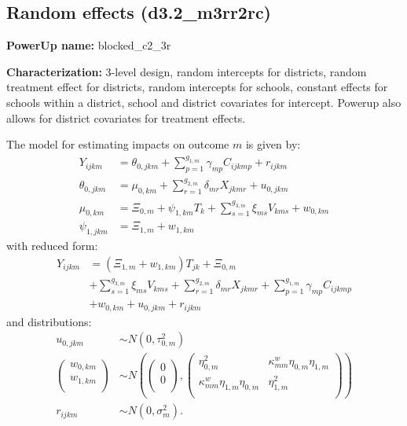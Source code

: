 \documentclass[12pt]{article}
\begin{document}
\newpage
\subsection{Random effects (d3.2\_m3rr2rc)}

\textbf{PowerUp name:} blocked\_c2\_3r

\textbf{Characterization:} 3-level design, random intercepts for districts, random treatment effect for districts, random intercepts for schools, constant effects for schools within a district, school and district covariates for intercept. Powerup also allows for district covariates for treatment effects.

The model for estimating impacts on outcome $m$ is given by:
\begin{align}
Y_{ijkm} &=  \theta_{0,jkm} + \sum_{p=1}^{g_{1,m}} \gamma_{mp} C_{ijkmp} + r_{ijkm}\\
\nonumber \theta_{0,jkm} &= \mu_{0,km} + \sum_{r=1}^{g_{2,m}} \delta_{mr} X_{jkmr} + u_{0,jkm}\\
\nonumber \mu_{0,km}  &= \Xi_{0,m} + \psi_{1,km} T_{k} + \sum_{s=1}^{g_{3,m}} \xi_{ms} V_{kms} + w_{0,km} \\
\nonumber \psi_{1,jkm} &= \Xi_{1,m} + w_{1,km}
\end{align}
with reduced form:
\begin{align}
Y_{ijkm} &= \left(\Xi_{1,m} + w_{1,km}\right) T_{jk} + \Xi_{0,m}\\
\nonumber & + \sum_{s=1}^{g_{3,m}} \xi_{ms} V_{kms} + \sum_{r=1}^{g_{2,m}} \delta_{mr} X_{jkmr} + \sum_{p=1}^{g_{1,m}} \gamma_{mp} C_{ijkmp}\\
\nonumber &+ w_{0,km} + u_{0,jkm} + r_{ijkm}
\end{align}
and distributions:
\begin{align}
u_{0,jkm} &\sim N\left(0, \tau^2_{0,m}\right)\\
\nonumber \begin{pmatrix} w_{0, km} \\ w_{1,km}\\ \end{pmatrix} &\sim
N\left(\begin{pmatrix} 0 \\ 0\\ \end{pmatrix}, \begin{pmatrix} \eta^2_{0,m} & \kappa^w_{mm} \eta_{0,m} \eta_{1,m} \\ \kappa^w_{mm} \eta_{1,m} \eta_{0,m} & \eta^2_{1,m} \\ \end{pmatrix}\right) \\
\nonumber r_{ijkm} &\sim N\left(0, \sigma^2_m\right).
\end{align}
\end{document}
